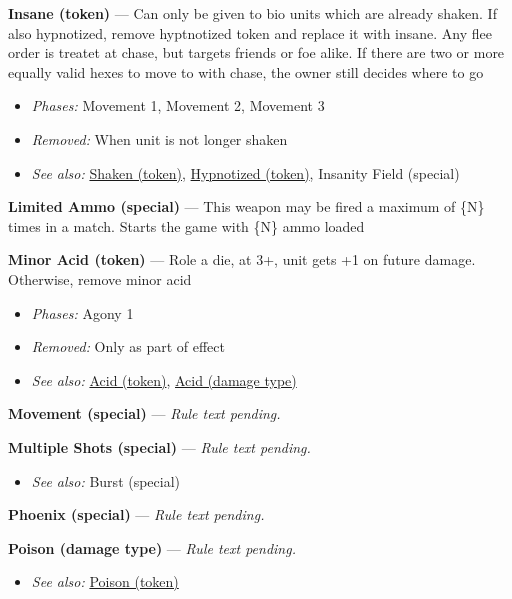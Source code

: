 \documentclass[a4paper,12pt]{article}
\begin{document}
\label{rule-token-insane}%
\noindent\textbf{Insane (token)} --- Can only be given to bio units which are already shaken. If also hypnotized, remove hyptnotized token and replace it with insane. Any flee order is treatet at chase, but targets friends or foe alike. If there are two or more equally valid hexes to move to with chase, the owner still decides where to go
\begin{itemize}
\item \textit{Phases:} Movement 1, Movement 2, Movement 3
\item \textit{Removed:} When unit is not longer shaken
\item \textit{See also:} \hyperref[rule-token-shaken]{Shaken (token)}, \hyperref[rule-token-hypnotized]{Hypnotized (token)}, Insanity Field (special)
\end{itemize}


\label{rule-special-limited-ammo}%
\noindent\textbf{Limited Ammo (special)} --- This weapon may be fired a maximum of \{N\} times in a match. Starts the game with \{N\} ammo loaded


\label{rule-token-minor-acid}%
\noindent\textbf{Minor Acid (token)} --- Role a die, at 3+, unit gets +1 on future damage. Otherwise, remove minor acid
\begin{itemize}
\item \textit{Phases:} Agony 1
\item \textit{Removed:} Only as part of effect
\item \textit{See also:} \hyperref[rule-token-acid]{Acid (token)}, \hyperref[rule-damage-type-acid]{Acid (damage type)}
\end{itemize}


\label{rule-special-movement}%
\noindent\textbf{Movement (special)} --- \textit{Rule text pending.}

\label{rule-special-multiple-shots}%
\noindent\textbf{Multiple Shots (special)} --- \textit{Rule text pending.}\begin{itemize}
\item \textit{See also:} Burst (special)
\end{itemize}


\label{rule-special-phoenix}%
\noindent\textbf{Phoenix (special)} --- \textit{Rule text pending.}

\label{rule-damage-type-poison}%
\noindent\textbf{Poison (damage type)} --- \textit{Rule text pending.}\begin{itemize}
\item \textit{See also:} \hyperref[rule-token-poison]{Poison (token)}
\end{itemize}
\end{document}
